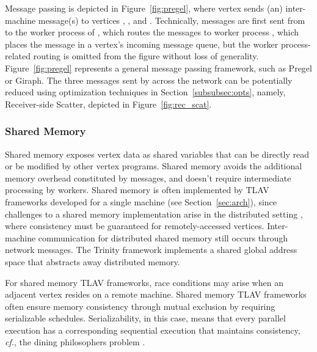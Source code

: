 \documentclass[reprint,twocolumn,showpacs,preprintnumbers,amsmath, aps,pre,amssymb]{revtex4-1}
\begin{document}
Message passing is depicted in Figure~\ref{fig:pregel}, where vertex  sends (an) inter-machine message(s) to vertices , , and .  Technically, messages are first sent from  to the worker process of , which routes the messages to worker process , which places the message in a vertex's incoming message queue, but the worker process-related routing is omitted from the figure without loss of generality.  Figure~\ref{fig:pregel} represents a general message passing framework, such as Pregel or Giraph.  The three messages sent by  across the network can be potentially reduced using optimization techniques in Section~\ref{subsubsec:opts}, namely, Receiver-side Scatter, depicted in Figure~\ref{fig:rec_scat}.  

\subsubsection{Shared Memory}
\label{subsubsec:shared}

Shared memory exposes vertex data as shared variables that can be directly read or be modified by other vertex programs.  Shared memory avoids the additional memory overhead constituted by messages, and doesn't require intermediate processing by workers.  Shared memory is often implemented by TLAV frameworks developed for a single machine (see Section~\ref{sec:arch}), since challenges to a shared memory implementation arise in the distributed setting \cite{Protic1998,Nitzberg1991}, where consistency must be guaranteed for remotely-accessed vertices.  Inter-machine communication for distributed shared memory still occurs through network messages.  The Trinity framework \cite{Shao2013} implements a shared global address space that abstracts away distributed memory.

For shared memory TLAV frameworks, race conditions may arise when an adjacent vertex resides on a remote machine.  Shared memory TLAV frameworks often ensure memory consistency through mutual exclusion by requiring serializable schedules. Serializability, in this case, means that every parallel execution has a corresponding sequential execution that maintains consistency, {\em cf.}, the dining philosophers problem \cite{Low2012,Gonzalez2012}.  
\end{document}
